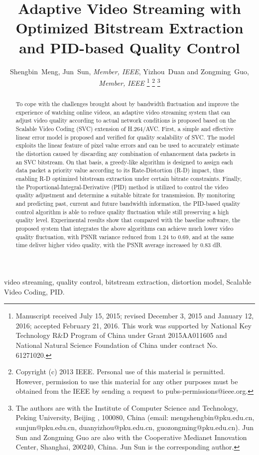 \documentclass[journal,draftclsnofoot,onecolumn]{IEEEtran}
\title{Adaptive Video Streaming with Optimized Bitstream Extraction and PID-based Quality Control}
\author{Shengbin~Meng, Jun~Sun, {\em Member, IEEE}, Yizhou~Duan and Zongming~Guo, {\em Member, IEEE} %
\thanks{Manuscript received July 15, 2015; revised December 3, 2015 and January 12, 2016; accepted February 21, 2016. This work was supported by  National Key Technology R\&D Program of China under Grant 2015AA011605 and National Natural Science Foundation of China under contract No. 61271020.}
\thanks{Copyright (c) 2013 IEEE. Personal use of this material is permitted. However, permission to use this material for any other purposes must be obtained from the IEEE by sending a request to pubs-permissions@ieee.org.}
\thanks{The authors are with the Institute of Computer Science and Technology, Peking University, Beijing%
, 100080, China (email: mengshengbin@pku.edu.cn, sunjun@pku.edu.cn, duanyizhou@pku.edu.cn, guozongming@pku.edu.cn). Jun Sun and Zongming Guo are also with the Cooperative Medianet Innovation Center, Shanghai, 200240, China. Jun Sun is the corresponding author.}
}
\begin{document}



\maketitle

\begin{abstract}
To cope with the challenges brought about by bandwidth fluctuation and improve the experience of watching online videos, an adaptive video streaming system that can adjust video quality according to actual network conditions is proposed based on the Scalable Video Coding (SVC) extension of H.264/AVC. First, a simple and effective linear error model is proposed and verified for quality scalability of SVC. The model exploits the linear feature of pixel value errors and can be used to accurately estimate the distortion caused by discarding any combination of enhancement data packets in an SVC bitstream. On that basis, a greedy-like algorithm is designed to assign each data packet a priority value according to its Rate-Distortion (R-D) impact, thus enabling R-D optimized bitstream extraction under certain bitrate constraints. Finally, the Proportional-Integral-Derivative (PID) method is utilized to control the video quality adjustment and determine a suitable bitrate for transmission. By monitoring and predicting past, current and future bandwidth information, the PID-based quality control algorithm is able to reduce quality fluctuation while still preserving a high quality level. Experimental results show that compared with the baseline software, the proposed system that integrates the above algorithms can achieve much lower video quality fluctuation, with PSNR variance reduced from 1.24 to 0.69, and at the same time deliver higher video quality, with the PSNR average increased by 0.83 dB.
\end{abstract}

\begin{IEEEkeywords}
video streaming, quality control, bitstream extraction, distortion model, Scalable Video Coding, PID.
\end{IEEEkeywords}



%
\IEEEpeerreviewmaketitle
\end{document}

